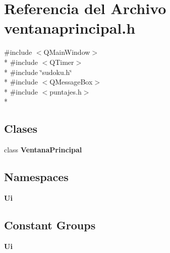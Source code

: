 \section{Referencia del Archivo ventanaprincipal.\-h}
\label{ventanaprincipal_8h}
{\ttfamily \#include $<$Q\-Main\-Window$>$}\\*
{\ttfamily \#include $<$Q\-Timer$>$}\\*
{\ttfamily \#include \char`\"{}sudoku.\-h\char`\"{}}\\*
{\ttfamily \#include $<$Q\-Message\-Box$>$}\\*
{\ttfamily \#include $<$puntajes.\-h$>$}\\*
\subsection*{Clases}
\begin{DoxyCompactItemize}
\item 
class {\bf Ventana\-Principal}
\end{DoxyCompactItemize}
\subsection*{Namespaces}
\begin{DoxyCompactItemize}
\item 
{\bf Ui}
\end{DoxyCompactItemize}
\subsection*{Constant Groups}
\begin{DoxyCompactItemize}
\item 
{\bf Ui}
\end{DoxyCompactItemize}
